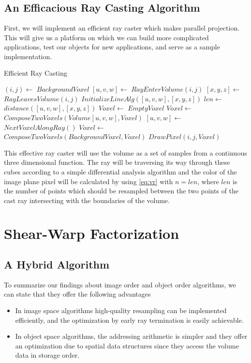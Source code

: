 \documentclass[a4paper,12pt]{article}
\begin{document}
\subsection{An Efficacious Ray Casting Algorithm}

First, we will implement an efficient ray caster which makes
parallel projection. This will give us a platform on which we can
build more complicated applications, test our objects for new
applications, and serve as a sample implementation.

\begin{algorithm}
\caption{Efficient Ray Casting}
\label{alg:src}
\begin{algorithmic}
  \STATE $(i,j) \gets $
  $BackgroundVoxel$
  \ENDFOR
   \STATE
  $[u,v,w] \gets$ $RayEnterVolume(i,j)$ \STATE $[x,y,z] \gets$
  $RayLeavesVolume(i,j)$ \STATE $InitializeLineAlg([u,v,w],[x,y,z]) $
  \STATE $len \gets$ $distance([u,v,w],[x,y,z])$ \STATE $Voxel \gets$
  $EmptyVoxel$   \STATE $Voxel \gets$
  $ComposeTwoVoxels(Volume[u,v,w],Voxel)$ \ENDIF \STATE $[u,v,w]
  \gets$ $NextVoxelAlongRay()$ \ENDWHILE {}
  \STATE $Voxel \gets$ $ComposeTwoVoxels(BackgroundVoxel,Voxel)$
  \ENDIF \STATE $DrawPixel(i,j,Voxel)$ \ENDFOR
\end{algorithmic}
\end{algorithm}

This effective ray caster will use the volume as a set of samples
from a continuous three dimensional function.
The ray will be traversing its
way through these cubes according to a simple differential analysis
algorithm and the color of the image plane pixel will be calculated by
using \ref{eq:vr} with $n = len$, where $len$ is the number of points
which should be resampled
between the two points of the cast ray intersecting with the
boundaries of the volume.


\section{Shear-Warp Factorization}

\subsection{A Hybrid Algorithm}

To summarize our findings about image order and object order
algorithms, we can state that they offer the following advantages
\begin{itemize}
\item In image space algorithms high-quality resampling can be
  implemented efficiently, and the optimization by early ray
  termination is easily achievable.
\item In object space algorithms, the addressing arithmetic is simpler
  and they offer an optimization due to spatial data structures since
  they access the volume data in storage order.
\end{itemize}
\end{document}
